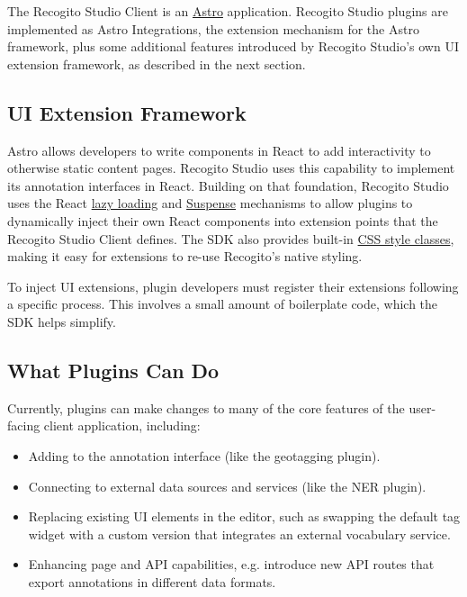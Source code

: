 \documentclass[final]{anthology-ch}         %
\begin{document}
The Recogito Studio Client is an \href{https://astro.build}{Astro} application. Recogito Studio plugins are implemented as Astro Integrations, the extension mechanism for the Astro framework, plus some additional features introduced by Recogito Studio's own UI extension framework, as described in the next section.

\subsection{UI Extension Framework} \label{sec:plugins_ui_extension}

Astro allows developers to write components in React to add interactivity to otherwise static content pages. Recogito Studio uses this capability to implement its annotation interfaces in React. Building on that foundation, Recogito Studio uses the React \href{https://react.dev/reference/react/lazy#suspense-for-code-splitting}{lazy loading} and \href{https://react.dev/reference/react/Suspense}{Suspense} mechanisms to allow plugins to dynamically inject their own React components into extension points that the Recogito Studio Client defines. The SDK also provides built-in \href{https://recogitostudio.org/guides/sdk/#component-styling}{CSS style classes}, making it easy for extensions to re-use Recogito's native styling.

To inject UI extensions, plugin developers must register their extensions following a specific process. This involves a small amount of boilerplate code, which the SDK helps simplify.

\subsection{What Plugins Can Do} \label{sec:plugins_capabilities}
Currently, plugins can make changes to many of the core features of the user-facing client application, including:
\begin{itemize}
  \item Adding to the annotation interface (like the geotagging plugin).
  \item Connecting to external data sources and services (like the NER plugin).
  \item Replacing existing UI elements in the editor, such as swapping the default tag widget with a custom version that integrates an external vocabulary service.
  \item Enhancing page and API capabilities, e.g. introduce new API routes that export annotations in different data formats.

\end{itemize}
\end{document}
